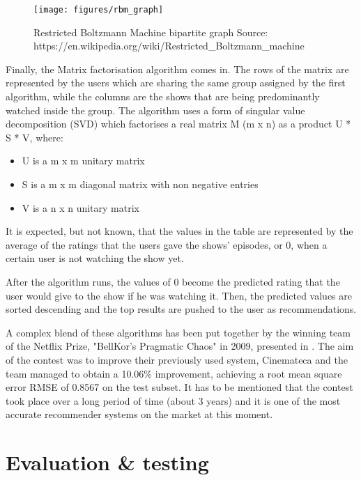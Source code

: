 \begin{figure}[h]
\centering
\texttt{[image: figures/rbm\_graph]}
\caption{Restricted Boltzmann Machine bipartite graph \newline Source: https://en.wikipedia.org/wiki/Restricted\_Boltzmann\_machine}
\label{fig:rbmgraph}
\end{figure}


Finally, the Matrix factorisation algorithm comes in. The rows of the matrix are represented by the users which are sharing the same group assigned by the first algorithm, while the columns are the shows that are being predominantly watched inside the group. The algorithm uses a form of singular value decomposition (SVD) \cite{svd} which factorises a real matrix M (m x n) as a product U * S * V, where:

\begin{itemize}
    \item U is a m x m unitary matrix
    \item S is a m x m diagonal matrix with non negative  entries
    \item V is a n x n unitary matrix
\end{itemize}

It is expected, but not known, that the values in the table are represented by the average of the ratings that the users gave the shows' episodes, or 0, when a certain user is not watching the show yet.

After the algorithm runs, the values of 0 become the predicted rating that the user would give to the show if he was watching it. Then, the predicted values are sorted descending and the top results are pushed to the user as recommendations.

A complex blend of these algorithms has been put together by the winning team of the Netflix Prize, "BellKor's Pragmatic Chaos" in 2009, presented in \cite{belkor}. The aim of the contest was to improve their previously used system, Cinemateca and the team managed to obtain a 10.06\% improvement, achieving a root mean square error RMSE of 0.8567 on the test subset. 
It has to be mentioned that the contest took place over a long period of time (about 3 years) and it is one of the most accurate recommender systems on the market at this moment.

\section{Evaluation \& testing}

